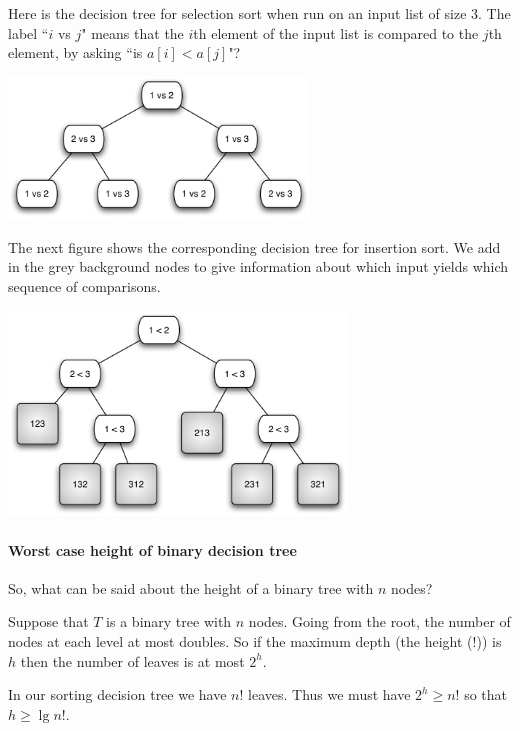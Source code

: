 \begin{Example}
Here is the decision tree for selection sort when run on an  input list of size $3$. The label 
``$i$ vs $j$" means that the $i$th element of the input list is compared to the $j$th element, by asking
``is $a[i] < a[j]$"?
\begin{center}
\includegraphics[width=8cm]{figs/selsort-dt}
\end{center}


The next figure shows the corresponding decision tree for insertion sort. We add in the grey background nodes to give information about 
which input yields which sequence of comparisons.
\begin{center}
\includegraphics[width=9cm]{figs/insort-dt}
\end{center} 
\end{Example}

\paragraph{Worst case height of binary decision tree} 
So, what can be said about the height of a binary tree with 
$n$ nodes?

Suppose that $T$ is a binary tree with $n$ nodes. Going from the root, the
 number of nodes at each level at most doubles. So if the maximum depth (the 
 {height} (!)) is $h$ then the number of leaves is at most $2^h$. 
 
 In our sorting decision tree we have $n!$ leaves. Thus we must have $2^h 
\geq n!$ so that $h \geq \lg n!$. 

